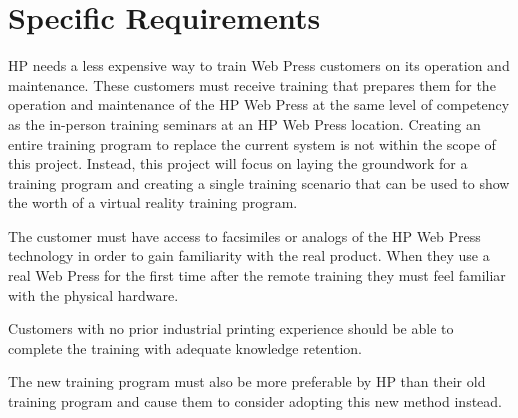 \documentclass[onecolumn, draftclsnofoot,10pt, compsoc]{IEEEtran}
\begin{document}
\section{Specific Requirements}
HP needs a less expensive way to train Web Press customers on its operation and maintenance. These customers must receive training that prepares them for the operation and maintenance of the HP Web Press at the same level of competency as the in-person training seminars at an HP Web Press location. Creating an entire training program to replace the current system is not within the scope of this project. Instead, this project will focus on laying the groundwork for a training program and creating a single training scenario that can be used to show the worth of a virtual reality training program. 

The customer must have access to facsimiles or analogs of the HP Web Press technology in order to gain familiarity with the real product. When they use a real Web Press for the first time after the remote training they must feel familiar with the physical hardware.

Customers with no prior industrial printing experience should be able to complete the training with adequate knowledge retention.


The new training program must also be more preferable by HP than their old training program and cause them to consider adopting this new method instead.

\end{document}
